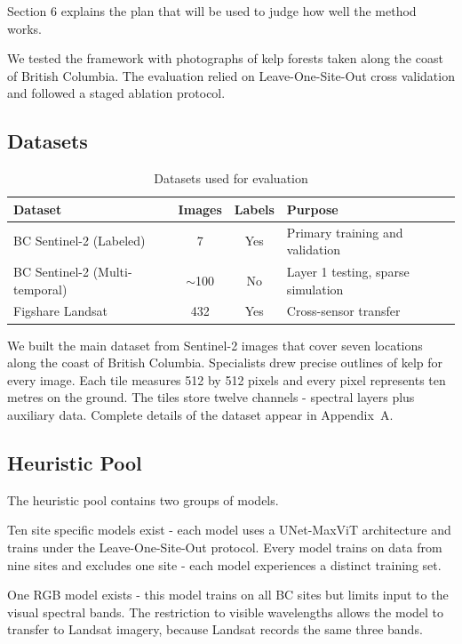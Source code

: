 \documentclass[11pt,a4paper]{article}
\begin{document}
\begin{itemize}
Section 6 explains the plan that will be used to judge how well the method works.

We tested the framework with photographs of kelp forests taken along the coast of British Columbia. The evaluation relied on Leave-One-Site-Out cross validation and followed a staged ablation protocol.

\subsection{Datasets}

\begin{table}[h]
\centering
\caption{Datasets used for evaluation}
\label{tab:datasets}
\begin{tabular}{lccp{5cm}}
\toprule
\textbf{Dataset} & \textbf{Images} & \textbf{Labels} & \textbf{Purpose} \\
\midrule
BC Sentinel-2 (Labeled) & 7 & Yes & Primary training and validation \\
BC Sentinel-2 (Multi-temporal) & $\sim$100 & No & Layer 1 testing, sparse simulation \\
Figshare Landsat & 432 & Yes & Cross-sensor transfer \\
\bottomrule
\end{tabular}
\end{table}

We built the main dataset from Sentinel-2 images that cover seven locations along the coast of British Columbia. Specialists drew precise outlines of kelp for every image. Each tile measures 512 by 512 pixels and every pixel represents ten metres on the ground. The tiles store twelve channels - spectral layers plus auxiliary data. Complete details of the dataset appear in Appendix~A.

\subsection{Heuristic Pool}

The heuristic pool contains two groups of models. 

Ten site specific models exist - each model uses a UNet-MaxViT architecture and trains under the Leave-One-Site-Out protocol. Every model trains on data from nine sites and excludes one site - each model experiences a distinct training set. 

One RGB model exists - this model trains on all BC sites but limits input to the visual spectral bands. The restriction to visible wavelengths allows the model to transfer to Landsat imagery, because Landsat records the same three bands.


\end{itemize}
\end{document}
